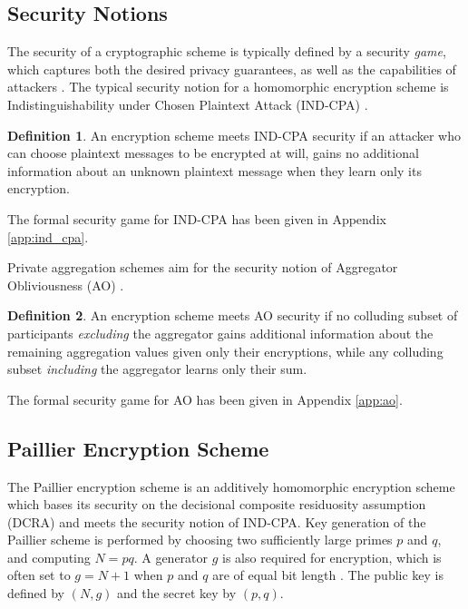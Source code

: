 \documentclass[10pt,letterpaper,oneside,twocolumn,journal]{IEEEtran}
\theoremstyle{definition}
\newtheorem{definition}{Definition}[section]
\theoremstyle{definition}
\theoremstyle{remark}
\begin{document}
\subsection{Security Notions}
The security of a cryptographic scheme is typically defined by a security \textit{game}, which captures both the desired privacy guarantees, as well as the capabilities of attackers \cite{katzIntroductionModernCryptography2008}. The typical security notion for a homomorphic encryption scheme is Indistinguishability under Chosen Plaintext Attack (IND-CPA) \cite{chaseSecurityHomomorphicEncryption2017}. 
\begin{definition}
An encryption scheme meets IND-CPA security if an attacker who can choose plaintext messages to be encrypted at will, gains no additional information about an unknown plaintext message when they learn only its encryption. 

The formal security game for IND-CPA has been given in Appendix \ref{app:ind_cpa}.
\end{definition}
Private aggregation schemes aim for the security notion of Aggregator Obliviousness (AO) \cite{shiPrivacyPreservingAggregationTimeSeries2011}. 
\begin{definition}
An encryption scheme meets AO security if no colluding subset of participants \textit{excluding} the aggregator gains additional information about the remaining aggregation values given only their encryptions, while any colluding subset \textit{including} the aggregator learns only their sum. 

The formal security game for AO has been given in Appendix \ref{app:ao}.
\end{definition}

% 
% 

\subsection{Paillier Encryption Scheme} \label{subsec:paillier_scheme}
The Paillier encryption scheme \cite{paillierPublicKeyCryptosystemsBased1999} is an additively homomorphic encryption scheme which bases its security on the decisional composite residuosity assumption (DCRA) and meets the security notion of IND-CPA. Key generation of the Paillier scheme is performed by choosing two sufficiently large primes $p$ and $q$, and computing $N=pq$. A generator $g$ is also required for encryption, which is often set to $g=N+1$ when $p$ and $q$ are of equal bit length \cite{katzIntroductionModernCryptography2008}. The public key is defined by $(N, g)$ and the secret key by $(p, q)$.
\end{document}
